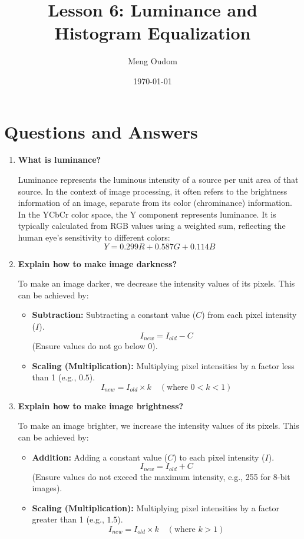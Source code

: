 \documentclass{article}
\title{Lesson 6: Luminance and Histogram Equalization}
\author{Meng Oudom}
\date{\today}
\begin{document}
\maketitle

\section{Questions and Answers}

\begin{enumerate}
    \item \textbf{What is luminance?}
    
    Luminance represents the luminous intensity of a source per unit area of that source. In the context of image processing, it often refers to the brightness information of an image, separate from its color (chrominance) information. In the YCbCr color space, the Y component represents luminance. It is typically calculated from RGB values using a weighted sum, reflecting the human eye's sensitivity to different colors:
    \[ Y = 0.299R + 0.587G + 0.114B \]

    \item \textbf{Explain how to make image darkness?}
    
    To make an image darker, we decrease the intensity values of its pixels. This can be achieved by:
    \begin{itemize}
        \item \textbf{Subtraction:} Subtracting a constant value ($C$) from each pixel intensity ($I$). 
        \[ I_{new} = I_{old} - C \]
        (Ensure values do not go below 0).
        \item \textbf{Scaling (Multiplication):} Multiplying pixel intensities by a factor less than 1 (e.g., $0.5$).
        \[ I_{new} = I_{old} \times k \quad (\text{where } 0 < k < 1) \]
    \end{itemize}

    \item \textbf{Explain how to make image brightness?}
    
    To make an image brighter, we increase the intensity values of its pixels. This can be achieved by:
    \begin{itemize}
        \item \textbf{Addition:} Adding a constant value ($C$) to each pixel intensity ($I$).
        \[ I_{new} = I_{old} + C \]
        (Ensure values do not exceed the maximum intensity, e.g., 255 for 8-bit images).
        \item \textbf{Scaling (Multiplication):} Multiplying pixel intensities by a factor greater than 1 (e.g., $1.5$).
        \[ I_{new} = I_{old} \times k \quad (\text{where } k > 1) \]
    \end{itemize}


\end{enumerate}
\end{document}
